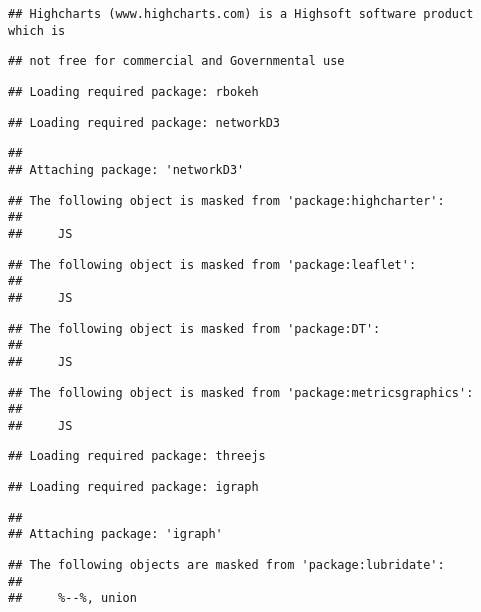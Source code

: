 \documentclass[
]{article}
\begin{document}
\begin{verbatim}
## Highcharts (www.highcharts.com) is a Highsoft software product which is
\end{verbatim}

\begin{verbatim}
## not free for commercial and Governmental use
\end{verbatim}

\begin{verbatim}
## Loading required package: rbokeh
\end{verbatim}

\begin{verbatim}
## Loading required package: networkD3
\end{verbatim}

\begin{verbatim}
## 
## Attaching package: 'networkD3'
\end{verbatim}

\begin{verbatim}
## The following object is masked from 'package:highcharter':
## 
##     JS
\end{verbatim}

\begin{verbatim}
## The following object is masked from 'package:leaflet':
## 
##     JS
\end{verbatim}

\begin{verbatim}
## The following object is masked from 'package:DT':
## 
##     JS
\end{verbatim}

\begin{verbatim}
## The following object is masked from 'package:metricsgraphics':
## 
##     JS
\end{verbatim}

\begin{verbatim}
## Loading required package: threejs
\end{verbatim}

\begin{verbatim}
## Loading required package: igraph
\end{verbatim}

\begin{verbatim}
## 
## Attaching package: 'igraph'
\end{verbatim}

\begin{verbatim}
## The following objects are masked from 'package:lubridate':
## 
##     %--%, union
\end{verbatim}
\end{document}
